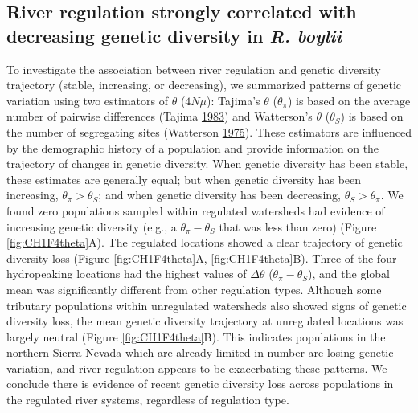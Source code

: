 \documentclass[twoside,12pt,final]{ucthesis-CA2012} %
\begin{document}
\begin{ucmainmatter}
\hypertarget{river-regulation-strongly-correlated-with-decreasing-genetic-diversity-in-r.-boylii}{%
\subsection{\texorpdfstring{River regulation strongly correlated with
decreasing genetic diversity in \emph{R.
boylii}}{River regulation strongly correlated with decreasing genetic diversity in R. boylii}}\label{river-regulation-strongly-correlated-with-decreasing-genetic-diversity-in-r.-boylii}}

To investigate the association between river regulation and genetic
diversity trajectory (stable, increasing, or decreasing), we summarized
patterns of genetic variation using two estimators of \(\theta\)
(\(4N\mu\)): Tajima's \(\theta\) (\(\theta_\pi\)) is based on the
average number of pairwise differences (Tajima
\protect\hyperlink{ref-tajima_evolutionary_1983}{1983}) and Watterson's
\(\theta\) (\(\theta_S\)) is based on the number of segregating sites
(Watterson \protect\hyperlink{ref-watterson_number_1975}{1975}). These
estimators are influenced by the demographic history of a population and
provide information on the trajectory of changes in genetic diversity.
When genetic diversity has been stable, these estimates are generally
equal; but when genetic diversity has been increasing,
\(\theta_\pi > \theta_S\); and when genetic diversity has been
decreasing, \(\theta_S > \theta_\pi\). We found zero populations sampled
within regulated watersheds had evidence of increasing genetic diversity
(e.g., a \(\theta_\pi - \theta_S\) that was less than zero) (Figure
\ref{fig:CH1F4theta}A). The regulated locations showed a clear
trajectory of genetic diversity loss (Figure \ref{fig:CH1F4theta}A,
\ref{fig:CH1F4theta}B). Three of the four hydropeaking locations had the
highest values of \(\Delta\theta\) (\(\theta_\pi - \theta_S\)), and the
global mean was significantly different from other regulation types.
Although some tributary populations within unregulated watersheds also
showed signs of genetic diversity loss, the mean genetic diversity
trajectory at unregulated locations was largely neutral (Figure
\ref{fig:CH1F4theta}B). This indicates populations in the northern
Sierra Nevada which are already limited in number are losing genetic
variation, and river regulation appears to be exacerbating these
patterns. We conclude there is evidence of recent genetic diversity loss
across populations in the regulated river systems, regardless of
regulation type.











\end{ucmainmatter}
\end{document}
